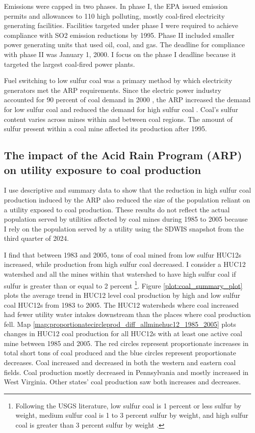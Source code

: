 \documentclass[12pt]{article}
\begin{document}
Emissions were capped in two phases. In phase I, the EPA issued emission permits and allowances to 110 high polluting, mostly coal-fired electricity generating facilities. Facilities targeted under phase I were required to achieve compliance with SO2 emission reductions by 1995. Phase II included smaller power generating units that used oil, coal, and gas. The deadline for compliance with phase II was January 1, 2000. I focus on the phase I deadline because it targeted the largest coal-fired power plants.

Fuel switching to low sulfur coal was a primary method by which electricity generators met the ARP requirements. Since the electric power industry accounted for 90 percent of coal demand in 2000 \parencite{freme2000us}, the ARP increased the demand for low sulfur coal and reduced the demand for high sulfur coal \parencite{epaarpcoalemp,stratford2015coalprod}. Coal's sulfur content varies across mines within and between coal regions. The amount of sulfur present within a coal mine affected its production after 1995.

\subsection{The impact of the Acid Rain Program (ARP) on utility exposure to coal production}

I use descriptive and summary data to show that the reduction in high sulfur coal production induced by the ARP also reduced the size of the population reliant on a utility exposed to coal production. These results do not reflect the actual population served by utilities affected by coal mines during 1985 to 2005 because I rely on the population served by a utility using the SDWIS snapshot from the third quarter of 2024.

I find that between 1983 and 2005, tons of coal mined from low sulfur HUC12s increased, while production from high sulfur coal decreased. I consider a HUC12 watershed and all the mines within that watershed to have high sulfur coal if sulfur is greater than or equal to 2 percent \footnote{Following the USGS literature, low sulfur coal is 1 percent or less sulfur by weight, medium sulfur coal is 1 to 3 percent sulfur by weight, and high sulfur coal is greater than 3 percent sulfur by weight \parencite{schweinfurth2009introduction}.}. Figure \ref{plot:coal_summary_plot} plots the average trend in HUC12 level coal production by high and low sulfur coal HUC12s from 1983 to 2005. The HUC12 watersheds where coal increased had fewer utility water intakes downstream than the places where coal production fell. Map \ref{map:proportionatecircleprod_diff_allminehuc12_1985_2005} plots changes in HUC12 coal production for all HUC12s with at least one active coal mine between 1985 and 2005. The red circles represent proportionate increases in total short tons of coal produced and the blue circles represent proportionate decreases. Coal increased and decreased in both the western and eastern coal fields. Coal production mostly decreased in Pennsylvania and mostly increased in West Virginia. Other states' coal production saw both increases and decreases.
\end{document}
